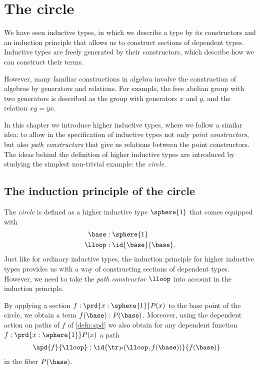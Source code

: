 
\section{The circle}

We have seen inductive types, in which we describe a type by its constructors and an induction principle that allows us to construct sections of dependent types. Inductive types are freely generated by their constructors, which describe how we can construct their terms. 

However, many familiar constructions in algebra involve the construction of algebras by generators and relations. 
For example, the free abelian group with two generators is described as the group with generators $x$ and $y$, and the relation $xy=yx$. 

In this chapter we introduce higher inductive types, where we follow a similar idea: to allow in the specification of inductive types not only \emph{point constructors}, but also \emph{path constructors} that give us relations between the point constructors. 
The ideas behind the definition of higher inductive types are introduced by studying the simplest non-trivial example: the \emph{circle}.

\subsection{The induction principle of the circle}
The \emph{circle} is defined as a higher inductive type $\sphere{1}$ that comes equipped with
\begin{align*}
\base & : \sphere{1} \\
\lloop & : \id{\base}{\base}.
\end{align*}
Just like for ordinary inductive types, the induction principle for higher inductive types provides us with a way of constructing sections of dependent types. However, we need to take the \emph{path constructor} $\lloop$ into account in the induction principle. 

By applying a section $f:\prd{x:\sphere{1}}P(x)$ to the base point of the circle, we obtain a term $f(\base):P(\base)$. Moreover, using the dependent action on paths of $f$ of \cref{defn:apd} we also obtain for any dependent function $f:\prd{x:\sphere{1}}P(x)$ a path
\begin{align*}
\apd{f}{\lloop} & : \id{\tr_P(\lloop,f(\base))}{f(\base)}
\end{align*}
in the fiber $P(\base)$.

